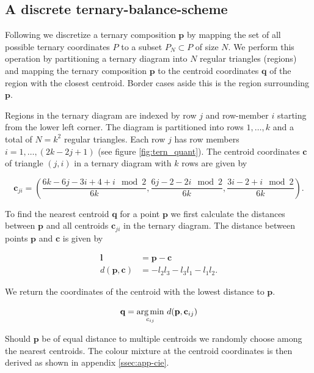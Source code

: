 \documentclass[parskip=half]{scrartcl}
\begin{document}
\begin{appendix}
\clearpage

\subsection{A discrete ternary-balance-scheme} %
\label{ssec:disc}

Following \textcite{Derakhshan2009} we discretize a ternary composition $\textbf{p}$ by mapping the set of all possible ternary coordinates $P$ to a subset $P_N \subset P$ of size $N$. We perform this operation by partitioning a ternary diagram into $N$ regular triangles (regions) and mapping the ternary composition $\textbf{p}$ to the centroid coordinates $\textbf{q}$ of the region with the closest centroid. Border cases aside this is the region surrounding $\textbf{p}$.

Regions in the ternary diagram are indexed by row $j$ and row-member $i$ starting from the lower left corner. The diagram is partitioned into rows $1,\ldots,k$ and a total of $N = k^2$ regular triangles. Each row $j$ has row members $i = 1, \ldots, (2k-2j+1)$ (see figure \ref{fig:tern_quant}). The centroid coordinates $\textbf{c}$ of triangle $(j,i)$ in a ternary diagram with $k$ rows are given by

\begin{equation*}
  \textbf{c}_{ji} = \left(\frac{6k - 6j - 3i + 4 + i\mod 2} {6k},
  \frac{6j - 2 - 2 i\mod 2} {6k},
  \frac{3i - 2 + i\mod 2} {6k} \right).
\end{equation*}

To find the nearest centroid $\textbf{q}$ for a point $\textbf{p}$ we first calculate the distances between $\textbf{p}$ and all centroids $\textbf{c}_{ji}$ in the ternary diagram. The distance between points $\textbf{p}$ and $\textbf{c}$ is given by

$$
\begin{aligned}
  \textbf{l} &= \textbf{p} - \textbf{c} \\
  d(\textbf{p}, \textbf{c}) &= - l_2l_3 - l_3l_1 - l_1l_2.
\end{aligned}
$$

We return the coordinates of the centroid with the lowest distance to $\textbf{p}$.

\begin{equation*}
\textbf{q} = \underset{c_{ij}}{\text{arg\,min}}~d(\textbf{p}, \textbf{c}_{ij})
\end{equation*}

Should $\textbf{p}$ be of equal distance to multiple centroids we randomly choose among the nearest centroids. The colour mixture at the centroid coordinates is then derived as shown in appendix \ref{ssec:app-cie}.


\end{appendix}
\end{document}
